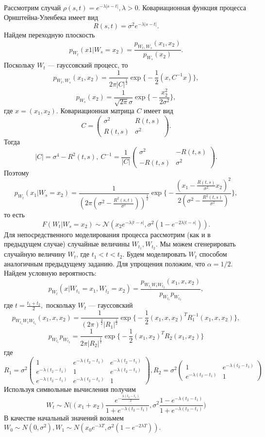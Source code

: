\documentclass[11pt]{article}
\begin{document}
Рассмотрим случай $\rho(s,t) = e^{-\lambda|s - t|}, \lambda > 0.$ Ковариационная функция процесса Орнштейна-Уленбека имеет вид
\[ R(s,t) = \sigma^2e^{-\lambda|s-t|}. \]
Найдем переходную плоскость
\[ p_{W_t}(x1|W_s = x_2) = \frac{p_{W_t,W_s}(x_1,x_2)}{p_{W_s}(x_2)}.\]
Поскольку $W_t$ --- гауссовский процесс, то 
\[ p_{W_t,W_s}(x_1,x_2) = \frac{1}{2\pi|C|^{\frac{1}{2}}}\exp\bigg\{ -\frac{1}{2}(x,C^{-1}x) \bigg\}, \]
\[ p_{W_s}(x_2) = \frac{1}{\sqrt{2\pi}\sigma}\exp \bigg\{-\frac{x_2^2}{2\sigma^2}  \bigg\}, \]
где $x = (x_1,x_2)$. Ковариационная матрица $C$ имеет вид
\[ C = \begin{pmatrix}
\sigma^2 & R(t,s) \\
R(t,s) & \sigma^2
\end{pmatrix}. \]
Тогда 
\[ |C| = \sigma^4 - R^2(t,s), \ C^{-1} = \frac{1}{|C|}\begin{pmatrix}
\sigma^2 & -R(t,s) \\
-R(t,s) & \sigma^2
\end{pmatrix}. \]
Поэтому
\[p_{W_t}(x_1|W_s = x_2) = \frac{1}{(2\pi(\sigma^2 - \frac{R^2(s,t)}{\sigma^2}))^\frac{1}{2}}\exp \Bigg\{ -\frac{(x_1 - \frac{R(t,s)}{\sigma^2}x_2)^2}{2(\sigma^2 - \frac{R^2(t,s)}{\sigma^2})} \Bigg\},   \]
то есть
\[F(W_t| W_s = x_2) \sim \mathcal{N}(x_2e^{-\lambda|t -s|},\sigma^2(1 - e^{-2\lambda|t-s|})). \]
Для непосредственного моделирования процесса рассмотрим (как и в предыдущем случае) случайные величины $W_{t_1},W_{t_2}.$ Мы можем сгенерировать случайную величину $W_t$, где $t_1 < t < t_2$. Будем моделировать $W_t$  способом аналогичным предыдущему заданию. Для упрощения положим, что $\alpha = 1/2.$ Найдем условную вероятность:
\[ p_{W_t}(x|W_{t_1} = x_1, W_{t_2} = x_2) = \frac{p_{W_{t_1}W_tW_{t_2}}(x_1,x,x_2)}{p_{W_{t_1}}p_{W_{t_2}}},  \]
где $t = \frac{t_1 + t_2}{2},$ поскольку $W_t$ --- гауссовский
\[ p_{W_{t_1}W_tW_{t_2}}(x_1,x,x_2) = \frac{1}{(2\pi)^\frac{3}{2}|R_1|^\frac{1}{2}}\exp\bigg\{-\frac{1}{2}(x_1,x,x_2)^TR_1^{-1}(x_1,x,x_2)\bigg\}, \]
\[p_{W_{t_1}}p_{W_{t_2}} = \frac{1}{2\pi|R_2|^\frac{1}{2}}\exp\bigg\{-\frac{1}{2} (x_1,x_2)^TR_2(x_1,x_2) \bigg\}  \]
где 
\[ R_1 = \sigma^2 \begin{pmatrix}
1 & e^{-\lambda(t_2 - t_1)} & e^{-\lambda(t_2 - t_1)}  \\
e^{-\lambda(t_2 - t_1)}  & 1& e^{-\lambda(t_2 - t_1)}  \\
e^{-\lambda(t_2 - t_1)}  & e^{-\lambda(t_2 - t_1)}  & 1
\end{pmatrix}, R_2 = \sigma^2\begin{pmatrix}
1 & e^{-\lambda(t_2 - t_1)} \\
e^{-\lambda(t_2 - t_1)}  & 1
\end{pmatrix} \]
Используя символьные вычисления получим
\[ W_t \sim N\bigg( (x_1 + x_2)\frac{e^{-\frac{\lambda(t_2 - t_1)}{2}}}{1 + e^{-\lambda(t_2 - t_1)}}, \sigma^2 \frac{1 - e^{-\lambda(t_2 - t_1)}}{1 + e^{-\lambda(t_2 - t_1)}} \bigg) \]
В качестве начальный значений возьмем $W_0 \sim N(0,\sigma^2), W_1 \sim N(x_0e^{-\lambda T},\sigma^2(1 - e^{-2\lambda T})).$
\end{document}
